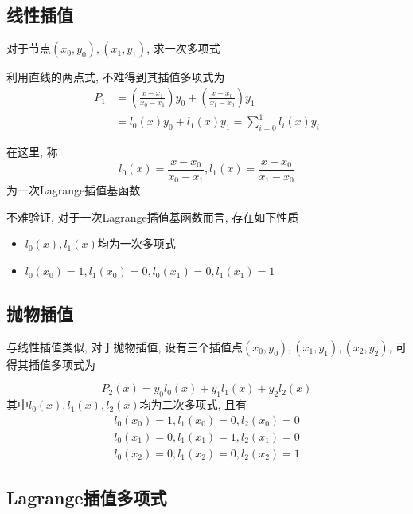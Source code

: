 \subsection{线性插值}

\begin{example}
    对于节点$(x_0,y_0),(x_1,y_1)$, 求一次多项式
\end{example}

\begin{solution}
    利用直线的两点式, 不难得到其插值多项式为
    \begin{align*}
        P_1 &= \left(\frac{x-x_1}{x_0-x_1}\right)y_0+\left(\frac{x-x_0}{x_1-x_0}\right)y_1\\
        &=l_0(x)y_0+l_1(x)y_1=\sum_{i=0}^1l_i(x)y_i
    \end{align*}
\end{solution}

在这里, 称
\begin{equation*}
    l_0(x)=\frac{x-x_0}{x_0-x_1}, l_1(x) = \frac{x-x_0}{x_1-x_0}
\end{equation*}
为一次Lagrange插值基函数.

不难验证, 对于一次Lagrange插值基函数而言, 存在如下性质
\begin{itemize}
    \item $l_0(x), l_1(x)$均为一次多项式
    \item $l_0(x_0)=1, l_1(x_0)=0, l_0(x_1)=0, l_1(x_1)=1$
\end{itemize}

\subsection{抛物插值}

与线性插值类似, 对于抛物插值, 设有三个插值点$(x_0,y_0),(x_1,y_1),(x_2,y_2)$, 可得其插值多项式为

\begin{equation*}
    P_2(x)=y_0l_0(x)+y_1l_1(x)+y_2l_2(x)
\end{equation*}
其中$l_0(x),l_1(x),l_2(x)$均为二次多项式, 且有
\begin{align*}
    l_0(x_0)=1,l_1(x_0)=0,l_2(x_0)=0\\
    l_0(x_1)=0,l_1(x_1)=1,l_2(x_1)=0\\
    l_0(x_2)=0,l_1(x_2)=0,l_2(x_2)=1
\end{align*}

\subsection{Lagrange插值多项式}

